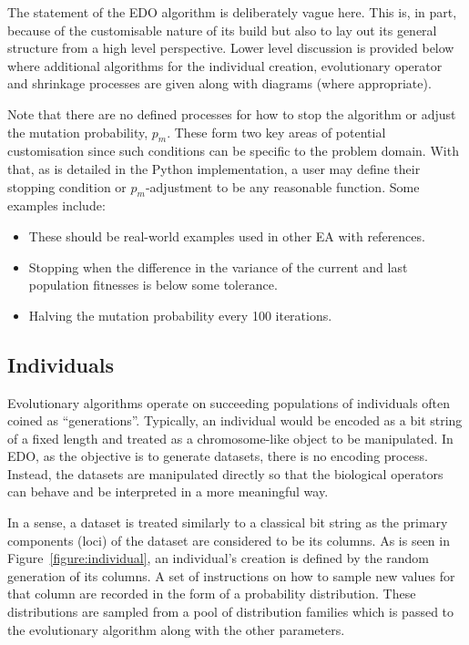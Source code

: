The statement of the EDO algorithm is deliberately vague here. This is, in part,
because of the customisable nature of its build but also to lay out its general
structure from a high level perspective. Lower level discussion is provided
below where additional algorithms for the
individual creation, evolutionary operator and shrinkage processes are given
along with diagrams (where appropriate).

Note that there are no defined processes for how to stop the algorithm or adjust
the mutation probability, \(p_m\). These form two key areas of potential
customisation since such conditions can be specific to the problem domain. With
that, as is detailed in the Python implementation, a user may define their
stopping condition or \(p_m\)-adjustment to be any reasonable function. Some
examples include:

\begin{itemize}
    \item These should be real-world examples used in other EA with references.
    \item Stopping when the difference in the variance of the current and last
        population fitnesses is below some tolerance.
    \item Halving the mutation probability every 100 iterations.
\end{itemize}

\subsection{Individuals}

Evolutionary algorithms operate on succeeding populations of individuals often
coined as ``generations''. Typically, an individual would be encoded as a bit
string of a fixed length and treated as a chromosome-like object to be
manipulated. In EDO, as the objective is to generate datasets, there is no
encoding process. Instead, the datasets are manipulated directly so that the
biological operators can behave and be interpreted in a more meaningful way.


In a sense, a dataset is treated similarly to a classical bit string as the
primary components (loci) of the dataset are considered to be its columns. As is
seen in Figure~\ref{figure:individual}, an individual's creation is defined by
the random generation of its columns. A set of instructions on how to sample new
values for that column are recorded in the form of a probability distribution.
These distributions are sampled from a pool of distribution families which is
passed to the evolutionary algorithm along with the other parameters.

